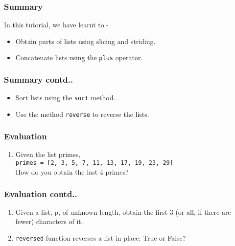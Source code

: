 \documentclass[17pt,compress]{beamer}
\newcounter{saveenumi}
\newcommand{\seti}{\setcounter{saveenumi}{\value{enumi}}}
\newcommand{\conti}{\setcounter{enumi}{\value{saveenumi}}}
\begin{document}
\begin{frame}
\frametitle{Summary}
\label{sec-9.1}

  In this tutorial, we have learnt to -

\begin{itemize}
\item Obtain parts of lists using slicing and striding.
\item Concatenate lists using the \texttt{plus} operator.
\end{itemize}
\end{frame}
\begin{frame}
\frametitle{Summary contd..}
\label{sec-9.2}

\begin{itemize}
\item Sort lists using the \texttt{sort} method.
\item Use the method \texttt{reverse} to reverse the lists.
\end{itemize}
\end{frame}
\begin{frame}
\frametitle{Evaluation}
\label{sec-10.1}

\begin{enumerate}
\item Given the list primes,\\ \texttt{primes = [2, 3, 5, 7, 11, 13, 17, 19, 23,
   29]} \pause\\ How do you obtain the last 4 primes?  
\seti
\end{enumerate}
\end{frame}
\begin{frame}
\frametitle{Evaluation contd..}
\label{sec-10.2}

\begin{enumerate}
\conti  
\item Given a list, p, of unknown length, obtain the first 3 (or all, if
   there are fewer) characters of it.\pause
\item \texttt{reversed} function reverses a list in place. True or False?
\end{enumerate}
\end{frame}
\end{document}
